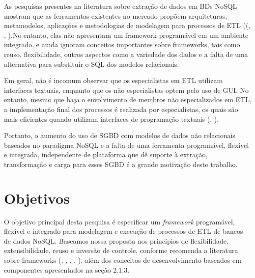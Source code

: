 
As pesquisas presentes na literatura sobre extração de dados em BDs NoSQL mostram que as ferramentas existentes no mercado propõem arquiteturas, metamodelos, aplicações e metodologias de modelagem para processos de ETL  ((\cite{silva:2016}, \cite{chevalier:2015}, \cite{liu:2013}).No entanto, elas não apresentam um framework programável em um ambiente integrado, e ainda ignoram conceitos importantes sobre frameworks, tais como reuso, flexibilidade, outros aspectos como a variedade dos dados e a falta de uma alternativa para substituir o SQL dos modelos relacionais.

Em geral, não é incomum observar que os especialistas em ETL utilizam interfaces textuais, enquanto que os não especialistas optem pelo uso de GUI. No entanto, mesmo que haja o envolvimento de membros não especializados em ETL, a implementação final dos processos é realizada por especialistas, os quais são mais eficientes quando utilizam interfaces de programação textuais (\cite{silva:2012}, \cite{mazanec:2012}).


Portanto, o aumento do uso de SGBD com modelos de dados não relacionais baseados no paradigma NoSQL e a falta de uma ferramenta programável, flexível e integrada, independente de plataforma que dê suporte à extração, transformação e carga para esses SGBD é a grande motivação deste trabalho.







\section{Objetivos}

O objetivo principal desta pesquisa é especificar um \textit{framework} programável, flexível e integrado para modelagem e execução de processos de ETL de bancos de dados NoSQL. Baseamos nossa proposta nos princípios de flexibilidade, extensibilidade, reuso e inversão de controle, conforme recomenda a literatura sobre frameworks (\cite{awad:2011}, \cite{vassiliadis:2005}, \cite{fayad:1999}, \cite{fayad:1997}, \cite{darmont:2005}), além dos conceitos de desenvolvimento baseados em componentes apresentados na seção 2.1.3.

